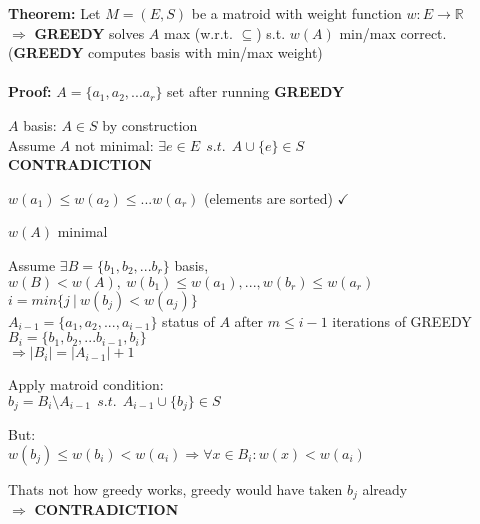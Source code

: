 \textbf{Theorem: } Let $M=(E, S)$ be a matroid with weight function $w:E\rightarrow \mathbb{R}$\\
$\Rightarrow$ \textbf{GREEDY} solves $A$ max (w.r.t. $\subseteq$) s.t. $w(A)$ min/max correct. (\textbf{GREEDY} computes basis with min/max weight)\\\\
\textbf{Proof: } $A=\{a_1, a_2, ... a_r\}$ set after running \textbf{GREEDY}
\begin{compactenum}
	\item{
		\begin{compactenum}[(a)]
			\item{$A$ basis: $A\in S$ by construction\\
			Assume $A$ not minimal: $\exists e \in E~~s.t.~~A\cup\{e\}\in S$\\ \textbf{CONTRADICTION}
			}
			\item{$w(a_1)\le w(a_2) \le ... w(a_r)$ (elements are sorted) $\checkmark$}
			\item{$w(A)$ minimal}
		\end{compactenum}
	\item{Assume $\exists B = \{b_1, b_2, ... b_r\}$ basis, $w(B) < w(A),~ w(b_1)\le w(a_1), ... , w(b_r)\le w(a_r)$\\
	$i=min\{j ~|~ w(b_j) < w(a_j)\}$}\\
	$A_{i-1}=\{a_1, a_2, ..., a_{i-1}\}$ status of $A$ after $m\le i-1$ iterations of GREEDY\\
	$B_i = \{b_1, b_2, ... b_{i-1}, b_i\}$\\
	$\Rightarrow |B_i| = |A_{i-1}|+1$
	}
	\item{Apply matroid condition:\\
	$b_j = B_i \setminus A_{i-1}~~s.t.~~A_{i-1}\cup \{b_j\}\in S$}
	\item{But:\\
	$w(b_j)\le w(b_i) < w(a_i) \Rightarrow \forall x \in B_i : w(x) < w(a_i)$}
	\item{Thats not how greedy works, greedy would have taken $b_j$ already\\
	$\Rightarrow$ \textbf{CONTRADICTION}}
\end{compactenum}

